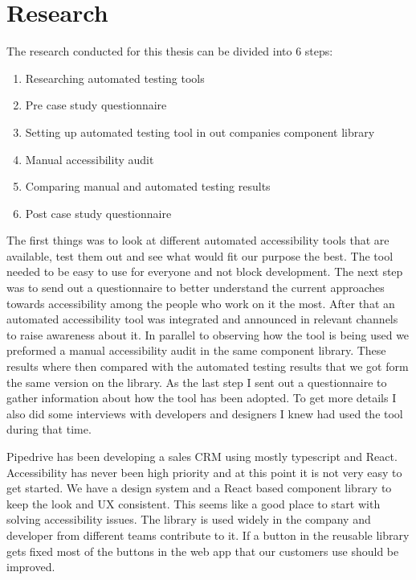 \documentclass{master_thesis}
\begin{document}
\section{Research}


The research conducted for this thesis can be divided into 6 steps:

\begin{enumerate}
	\item Researching automated testing tools
	\item Pre case study questionnaire
	\item Setting up automated testing tool in out companies component library
	\item Manual accessibility audit
	\item Comparing manual and automated testing results
	\item Post case study questionnaire
\end{enumerate}

The first things was to look at different automated accessibility tools that are available, test them out and see what would fit our purpose the best. The tool needed to be easy to use for everyone and not block development. The next step was to send out a questionnaire to better understand the current approaches towards accessibility among the people who work on it the most. After that an automated accessibility tool was integrated and announced in relevant channels to raise awareness about it. In parallel to observing how the tool is being used we preformed a manual accessibility audit in the same component library. These results where then compared with the automated testing results that we got form the same version on the library. As the last step I sent out a questionnaire to gather information about how the tool has been adopted. To get more details I also did some interviews with developers and designers I knew had used the tool during that time.

Pipedrive has been developing a sales CRM using mostly typescript and React. Accessibility has never been high priority and at this point it is not very easy to get started. We have a design system and a React based component library to keep the look and UX consistent. This seems like a good place to start with solving accessibility issues. The library is used widely in the company and developer from different teams contribute to it. If a button in the reusable library gets fixed most of the buttons in the web app that our customers use should be improved.
\end{document}
